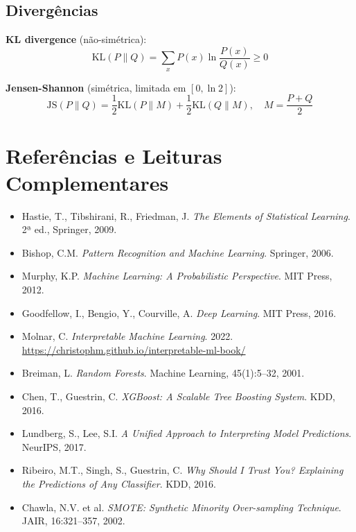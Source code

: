 \documentclass[12pt,a4paper,twoside]{book}
\theoremstyle{definition}
\theoremstyle{remark}
\begin{document}
\section{Divergências}

\textbf{KL divergence} (não-simétrica):
\[
\mathrm{KL}(P\|Q) = \sum_x P(x)\ln\frac{P(x)}{Q(x)} \geq 0
\]

\textbf{Jensen-Shannon} (simétrica, limitada em $[0,\ln 2]$):
\[
\mathrm{JS}(P\|Q) = \frac{1}{2}\mathrm{KL}(P\|M) + \frac{1}{2}\mathrm{KL}(Q\|M), \quad M = \frac{P+Q}{2}
\]

\chapter{Referências e Leituras Complementares}

\begin{itemize}[leftmargin=1.5cm]
  \item Hastie, T., Tibshirani, R., Friedman, J. \textit{The Elements of Statistical Learning}. 2ª ed., Springer, 2009.
  \item Bishop, C.M. \textit{Pattern Recognition and Machine Learning}. Springer, 2006.
  \item Murphy, K.P. \textit{Machine Learning: A Probabilistic Perspective}. MIT Press, 2012.
  \item Goodfellow, I., Bengio, Y., Courville, A. \textit{Deep Learning}. MIT Press, 2016.
  \item Molnar, C. \textit{Interpretable Machine Learning}. 2022. \url{https://christophm.github.io/interpretable-ml-book/}
  \item Breiman, L. \textit{Random Forests}. Machine Learning, 45(1):5--32, 2001.
  \item Chen, T., Guestrin, C. \textit{XGBoost: A Scalable Tree Boosting System}. KDD, 2016.
  \item Lundberg, S., Lee, S.I. \textit{A Unified Approach to Interpreting Model Predictions}. NeurIPS, 2017.
  \item Ribeiro, M.T., Singh, S., Guestrin, C. \textit{Why Should I Trust You? Explaining the Predictions of Any Classifier}. KDD, 2016.
  \item Chawla, N.V. et al. \textit{SMOTE: Synthetic Minority Over-sampling Technique}. JAIR, 16:321--357, 2002.
\end{itemize}

\backmatter
\printindex
\end{document}

